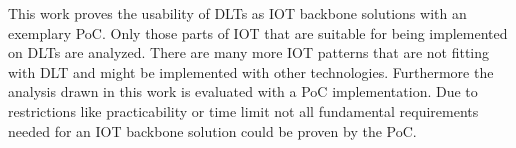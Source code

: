 \documentclass[
    ngerman,american
    ]{scrartcl}
\newcommand{\lang}{en}
\begin{document}
\begin{description}[style=unboxed]
            \item [\questionFour{\lang}]
                This work proves the usability of DLTs as IOT backbone solutions with an exemplary PoC.
                Only those parts of IOT that are suitable for being implemented on DLTs are analyzed. There are many more IOT patterns that are not fitting with DLT and might be implemented with other technologies.
                Furthermore the analysis drawn in this work is evaluated with a PoC implementation. Due to restrictions like practicability or time limit not all fundamental requirements needed for an IOT backbone solution could be proven by the PoC.


        \end{description}

        \newpage

        \sectionInitialTOC{\lang}
        \sectionInitialTOCDescription{\lang}
\end{document}
